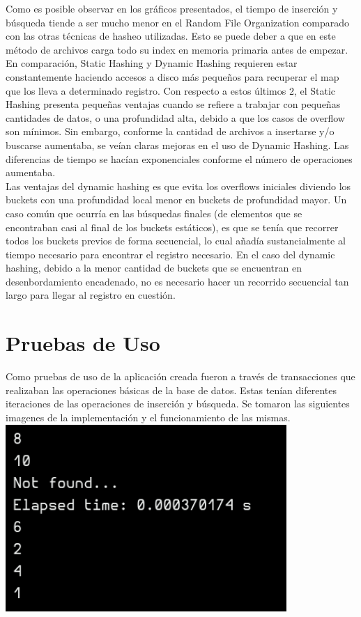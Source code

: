\documentclass{article}
\begin{document}
      Como es posible observar en los gráficos presentados, el tiempo de inserción y búsqueda tiende a ser mucho menor en el Random File Organization comparado con las otras técnicas de hasheo utilizadas. Esto se puede deber a que en este método de archivos carga todo su index en memoria primaria antes de empezar. En comparación, Static Hashing y Dynamic Hashing requieren estar constantemente haciendo accesos a disco más pequeños para recuperar el map que los lleva a determinado registro. Con respecto a estos últimos 2, el Static Hashing presenta pequeñas ventajas cuando se refiere a trabajar con pequeñas cantidades de datos, o una profundidad alta, debido a que los casos de overflow son mínimos. Sin embargo, conforme la cantidad de archivos a insertarse y/o buscarse aumentaba, se veían claras mejoras en el uso de Dynamic Hashing. Las diferencias de tiempo se hacían exponenciales conforme el número de operaciones aumentaba. \\

      Las ventajas del dynamic hashing es que evita los overflows iniciales diviendo los buckets con una profundidad local menor en buckets de profundidad mayor. Un caso común que ocurría en las búsquedas finales  (de elementos que se encontraban casi al final de los buckets estáticos), es que se tenía que recorrer todos los buckets previos de forma secuencial, lo cual añadía sustancialmente al tiempo necesario para encontrar el registro necesario. En el caso del dynamic hashing, debido a la menor cantidad de buckets que se encuentran en desenbordamiento encadenado, no es necesario hacer un recorrido secuencial tan largo para llegar al registro en cuestión.

  \section{Pruebas de Uso}

    Como pruebas de uso de la aplicación creada fueron a través de transacciones que realizaban las operaciones básicas de la base de datos. Estas tenían diferentes iteraciones de las operaciones de inserción y búsqueda. Se tomaron las siguientes imagenes de la implementación y el funcionamiento de las mismas. \\

    \includegraphics[width = 0.8\textwidth]{image1}
\end{document}
